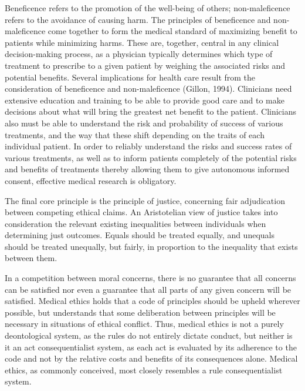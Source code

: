 \documentclass[]{spie}  %
\begin{document}
Beneficence refers to the promotion of the well-being of others; non-maleficence refers to the avoidance of causing harm. The principles of beneficence and non-maleficence come together to form the medical standard of maximizing benefit to patients while minimizing harms. These are, together, central in any clinical decision-making process, as a physician typically determines which type of treatment to prescribe to a given patient by weighing the associated risks and potential benefits. Several implications for health care result from the consideration of beneficence and non-maleficence (Gillon, 1994). Clinicians need extensive education and training to be able to provide good care and to make decisions about what will bring the greatest net benefit to the patient. Clinicians also must be able to understand the risk and probability of success of various treatments, and the way that these shift depending on the traits of each individual patient. In order to reliably understand the risks and success rates of various treatments, as well as to inform patients completely of the potential risks and benefits of treatments thereby allowing them to give autonomous informed consent, effective medical research is obligatory.

The final core principle is the principle of justice, concerning fair adjudication between competing ethical claims. An Aristotelian view of justice takes into consideration the relevant existing inequalities between individuals when determining just outcomes. Equals should be treated equally, and unequals should be treated unequally, but fairly, in proportion to the inequality that exists between them.

In a competition between moral concerns, there is no guarantee that all concerns can be satisfied nor even a guarantee that all parts of any given concern will be satisfied. Medical ethics holds that a code of principles should be upheld wherever possible, but understands that some deliberation between principles will be necessary in situations of ethical conflict. Thus, medical ethics is not a purely deontological system, as the rules do not entirely dictate conduct, but neither is it an act consequentialist system, as each act is evaluated by its adherence to the code and not by the relative costs and benefits of its consequences alone. Medical ethics, as commonly conceived, most closely resembles a rule consequentialist system.
\end{document}
